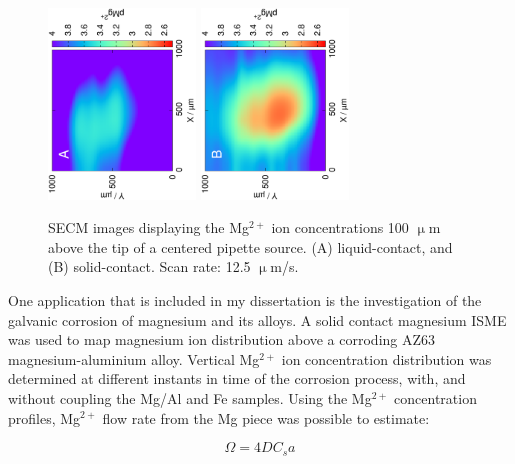 \begin{figure}
\centering
\includegraphics[trim = 10mm 30mm 0mm 10mm, clip, width=0.35\textwidth, angle=-90]{img/mg_pipette/liquid_Mg.eps} \includegraphics[trim = 10mm 30mm 0mm 10mm, clip, width=0.35\textwidth, angle=-90]{img/mg_pipette/solid_Mg.eps}
\caption[SECM images displaying the Mg$^{2+}$ ion concentrations 100 $\upmu$m above the tip of a centered pipette source.]{SECM images displaying the Mg$^{2+}$ ion concentrations 100 $\upmu$m above the tip of a centered pipette source.
(A) liquid-contact, and (B) solid-contact.
Scan rate: 12.5 $\upmu$m/s.}
\label{fig:solid_liquid_pipette}
\end{figure}

One application that is included in my dissertation is the investigation of the galvanic corrosion of magnesium and its alloys. A solid contact magnesium ISME was used to map magnesium ion distribution above a corroding AZ63 magnesium-aluminium alloy.
Vertical Mg$^{2+}$ ion concentration distribution was determined at different instants in time of the corrosion process, with, and without coupling the Mg/Al and Fe samples.
Using the Mg$^{2+}$ concentration profiles, Mg$^{2+}$ flow rate from the Mg piece was possible to estimate:

\begin{equation}
\label{eq:corrosion_current}
        \Omega = 4 D C_s a
\end{equation}

